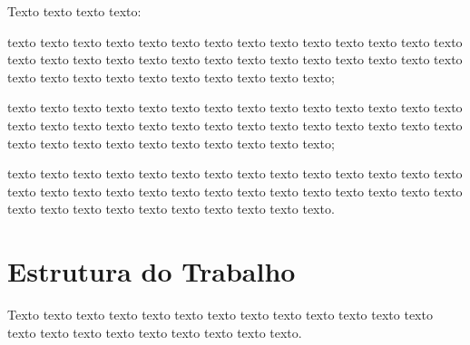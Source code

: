 Texto texto texto texto:
\begin{alineas}
    \item texto texto texto texto texto texto texto texto texto texto texto texto texto texto texto texto texto texto texto texto texto texto texto texto texto texto texto texto texto texto texto texto texto texto texto texto texto texto;
    \item texto texto texto texto texto texto texto texto texto texto texto texto texto texto texto texto texto texto texto texto texto texto texto texto texto texto texto texto texto texto texto texto texto texto texto texto texto texto; 
    \item texto texto texto texto texto texto texto texto texto texto texto texto texto texto texto texto texto texto texto texto texto texto texto texto texto texto texto texto texto texto texto texto texto texto texto texto texto texto.
\end{alineas}
    
\section{Estrutura do Trabalho}

Texto texto texto texto texto texto texto texto texto texto texto texto texto texto texto texto texto texto texto texto texto texto. 
